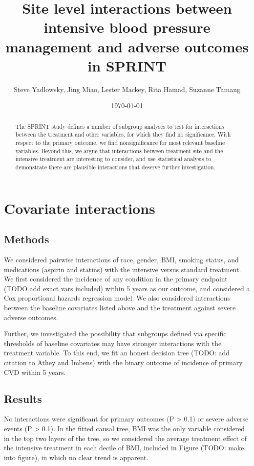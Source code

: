 \documentclass[10pt]{article}
\title{\vspace{-2em}Site level interactions between intensive blood pressure management and
  adverse outcomes in SPRINT}
\author{Steve Yadlowsky, Jing Miao, Lester Mackey, Rita Hamad, Suzanne Tamang}
\date{\today}
\begin{document}
 \maketitle

\begin{abstract}
  The SPRINT study defines a number of subgroup analyses to test for
  interactions between the treatment and other variables, for which they find no
  significance. With respect to the primary outcome, we find nonsignificance
  for most relevant baseline variables. Beyond this, we argue that interactions
  between treatment site and the intensive treatment are interesting to
  consider, and use statistical analysis to demonstrate there are plausible
  interactions that deserve further investigation. 
\end{abstract}

\section{Covariate interactions}
\subsection{Methods}
We considered pairwise interactions of race, gender, BMI, smoking status, and
medications (aspirin and statins) with the intensive versus standard
treatment. We first considered the incidence of any condition in the
primary endpoint (TODO add exact vars included) within 5 years as our outcome,
and considered a Cox proportional hazards regression model. We also considered
interactions between the baseline covariates listed above and the treatment
against severe adverse outcomes.

Further, we investigated the possibility that subgroups defined via specific
thresholds of baseline covariates may have stronger interactions with the
treatment variable. To this end, we fit an honest decision tree (TODO: add
citation to Athey and Imbens) with the binary outcome of incidence of primary
CVD within 5 years.

\subsection{Results}
No interactions were significant for primary outcomes (P > 0.1) or severe
adverse events (P > 0.1). In the fitted causal tree, BMI was the only variable
considered in the top two layers of the tree, so we considered the average
treatment effect of the intensive treatment in each decile of BMI, included in
Figure (TODO: make into figure), in which no clear trend is apparent. 
\end{document}
